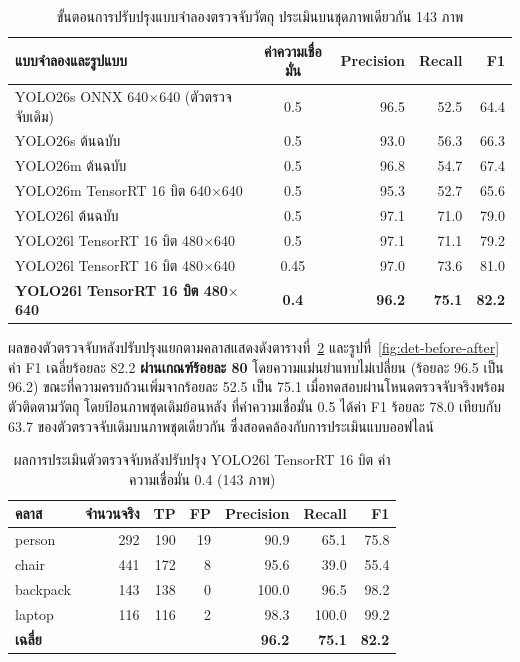 \documentclass[a4paper,12pt]{report}
\begin{document}
\begin{table}[H]
\centering
\caption[ขั้นตอนการปรับปรุงแบบจำลองตรวจจับวัตถุ (บทที่ 5)]{ขั้นตอนการปรับปรุงแบบจำลองตรวจจับวัตถุ ประเมินบนชุดภาพเดียวกัน 143 ภาพ}
\label{tab:det-improve}
\small
\begin{tabularx}{\textwidth}{|X|c|r|r|r|}
\hline
\textbf{แบบจำลองและรูปแบบ} & \textbf{ค่าความเชื่อมั่น} & \textbf{Precision} & \textbf{Recall} & \textbf{F1} \\
\hline
YOLO26s ONNX 640$\times$640 (ตัวตรวจจับเดิม) & 0.5 & 96.5 & 52.5 & 64.4 \\
YOLO26s ต้นฉบับ & 0.5 & 93.0 & 56.3 & 66.3 \\
YOLO26m ต้นฉบับ & 0.5 & 96.8 & 54.7 & 67.4 \\
YOLO26m TensorRT 16 บิต 640$\times$640 & 0.5 & 95.3 & 52.7 & 65.6 \\
YOLO26l ต้นฉบับ & 0.5 & 97.1 & 71.0 & 79.0 \\
YOLO26l TensorRT 16 บิต 480$\times$640 & 0.5 & 97.1 & 71.1 & 79.2 \\
YOLO26l TensorRT 16 บิต 480$\times$640 & 0.45 & 97.0 & 73.6 & 81.0 \\
\textbf{YOLO26l TensorRT 16 บิต 480$\times$640} & \textbf{0.4} & \textbf{96.2} & \textbf{75.1} & \textbf{82.2} \\
\hline
\end{tabularx}
\end{table}

ผลของตัวตรวจจับหลังปรับปรุงแยกตามคลาสแสดงดังตารางที่~\ref{tab:det-final}
และรูปที่~\ref{fig:det-before-after}
ค่า F1 เฉลี่ยร้อยละ 82.2 \textbf{ผ่านเกณฑ์ร้อยละ 80}
โดยความแม่นยำแทบไม่เปลี่ยน (ร้อยละ 96.5 เป็น 96.2) ขณะที่ความครบถ้วนเพิ่มจากร้อยละ 52.5 เป็น 75.1
เมื่อทดสอบผ่านโหนดตรวจจับจริงพร้อมตัวติดตามวัตถุ โดยป้อนภาพชุดเดิมย้อนหลัง
ที่ค่าความเชื่อมั่น 0.5 ได้ค่า F1 ร้อยละ 78.0 เทียบกับ 63.7 ของตัวตรวจจับเดิมบนภาพชุดเดียวกัน
ซึ่งสอดคล้องกับการประเมินแบบออฟไลน์

\begin{table}[H]
\centering
\caption[ผลการประเมินตัวตรวจจับหลังปรับปรุง YOLO26l (บทที่ 5)]{ผลการประเมินตัวตรวจจับหลังปรับปรุง YOLO26l TensorRT 16 บิต ค่าความเชื่อมั่น 0.4 (143 ภาพ)}
\label{tab:det-final}
\small
\begin{tabular}{|l|r|r|r|r|r|r|}
\hline
\textbf{คลาส} & \textbf{จำนวนจริง} & \textbf{TP} & \textbf{FP} & \textbf{Precision} & \textbf{Recall} & \textbf{F1} \\
\hline
person & 292 & 190 & 19 & 90.9 & 65.1 & 75.8 \\
chair & 441 & 172 & 8 & 95.6 & 39.0 & 55.4 \\
backpack & 143 & 138 & 0 & 100.0 & 96.5 & 98.2 \\
laptop & 116 & 116 & 2 & 98.3 & 100.0 & 99.2 \\
\hline
\textbf{เฉลี่ย} & & & & \textbf{96.2} & \textbf{75.1} & \textbf{82.2} \\
\hline
\end{tabular}
\end{table}
\end{document}
